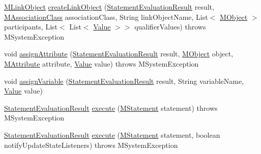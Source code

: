 \begin{DoxyCompactItemize}
\item 
\hyperlink{interfaceorg_1_1tzi_1_1use_1_1uml_1_1sys_1_1_m_link_object}{M\-Link\-Object} \hyperlink{classorg_1_1tzi_1_1use_1_1uml_1_1sys_1_1_m_system_ab5ac16e989a3f3b3fba48c3816ea775d}{create\-Link\-Object} (\hyperlink{classorg_1_1tzi_1_1use_1_1uml_1_1sys_1_1_statement_evaluation_result}{Statement\-Evaluation\-Result} result, \hyperlink{interfaceorg_1_1tzi_1_1use_1_1uml_1_1mm_1_1_m_association_class}{M\-Association\-Class} association\-Class, String link\-Object\-Name, List$<$ \hyperlink{interfaceorg_1_1tzi_1_1use_1_1uml_1_1sys_1_1_m_object}{M\-Object} $>$ participants, List$<$ List$<$ \hyperlink{classorg_1_1tzi_1_1use_1_1uml_1_1ocl_1_1value_1_1_value}{Value} $>$$>$ qualifier\-Values)  throws M\-System\-Exception 
\item 
void \hyperlink{classorg_1_1tzi_1_1use_1_1uml_1_1sys_1_1_m_system_ae579d7d4f8b65fa2f24c17bbbd8e9e5a}{assign\-Attribute} (\hyperlink{classorg_1_1tzi_1_1use_1_1uml_1_1sys_1_1_statement_evaluation_result}{Statement\-Evaluation\-Result} result, \hyperlink{interfaceorg_1_1tzi_1_1use_1_1uml_1_1sys_1_1_m_object}{M\-Object} object, \hyperlink{classorg_1_1tzi_1_1use_1_1uml_1_1mm_1_1_m_attribute}{M\-Attribute} attribute, \hyperlink{classorg_1_1tzi_1_1use_1_1uml_1_1ocl_1_1value_1_1_value}{Value} value)  throws M\-System\-Exception 
\item 
void \hyperlink{classorg_1_1tzi_1_1use_1_1uml_1_1sys_1_1_m_system_a78058b911442fb87de7273c412dc4b1c}{assign\-Variable} (\hyperlink{classorg_1_1tzi_1_1use_1_1uml_1_1sys_1_1_statement_evaluation_result}{Statement\-Evaluation\-Result} result, String variable\-Name, \hyperlink{classorg_1_1tzi_1_1use_1_1uml_1_1ocl_1_1value_1_1_value}{Value} value)
\item 
\hyperlink{classorg_1_1tzi_1_1use_1_1uml_1_1sys_1_1_statement_evaluation_result}{Statement\-Evaluation\-Result} \hyperlink{classorg_1_1tzi_1_1use_1_1uml_1_1sys_1_1_m_system_a38d516794883277bd4a3fc78db73fe5e}{execute} (\hyperlink{classorg_1_1tzi_1_1use_1_1uml_1_1sys_1_1soil_1_1_m_statement}{M\-Statement} statement)  throws M\-System\-Exception 
\item 
\hyperlink{classorg_1_1tzi_1_1use_1_1uml_1_1sys_1_1_statement_evaluation_result}{Statement\-Evaluation\-Result} \hyperlink{classorg_1_1tzi_1_1use_1_1uml_1_1sys_1_1_m_system_a3b221c678badb47223cde8675522fd71}{execute} (\hyperlink{classorg_1_1tzi_1_1use_1_1uml_1_1sys_1_1soil_1_1_m_statement}{M\-Statement} statement, boolean notify\-Update\-State\-Listeners)  throws M\-System\-Exception 
\item 
$$
\end{DoxyCompactItemize}
